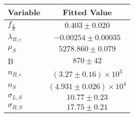 \begin{tabular}[t]{lc}
\hline
Variable &Fitted Value\\
\hline\hline
$f_{\frac{L}{R}}$&$0.403\pm0.020$\\
\hline
$\lambda_{B,c}$&$-0.00254\pm0.00035$\\
\hline
$\mu_S$&$5278.860\pm0.079$\\
\hline
B&$870\pm42$\\
\hline
$n_{B,c}$&$(3.27\pm0.16)\times 10^3$\\
\hline
$n_S$&$(4.931\pm0.026)\times 10^4$\\
\hline
$\sigma_{L, S}$&$10.77\pm0.23$\\
\hline
$\sigma_{R, S}$&$17.75\pm0.21$\\
\hline
\end{tabular}